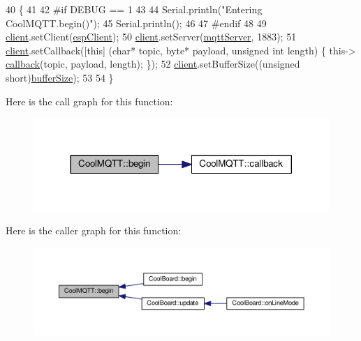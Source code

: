 \begin{DoxyCode}
40 \{ 
41 
42 \textcolor{preprocessor}{#if DEBUG == 1 }
43 
44     Serial.println(\textcolor{stringliteral}{"Entering CoolMQTT.begin()"});
45     Serial.println();
46 
47 \textcolor{preprocessor}{#endif}
48 
49     \hyperlink{classCoolMQTT_a4ca71e4f76ef868692a297efd45b1415}{client}.setClient(\hyperlink{classCoolMQTT_acc30a0200967374a524092a8a806502a}{espClient});
50     \hyperlink{classCoolMQTT_a4ca71e4f76ef868692a297efd45b1415}{client}.setServer(\hyperlink{classCoolMQTT_ab8bb951f87ddbf92db74c2ad16a3e53e}{mqttServer}, 1883); 
51     \hyperlink{classCoolMQTT_a4ca71e4f76ef868692a297efd45b1415}{client}.setCallback([\textcolor{keyword}{this}] (\textcolor{keywordtype}{char}* topic, byte* payload, \textcolor{keywordtype}{unsigned} \textcolor{keywordtype}{int} length) \{ this->
      \hyperlink{classCoolMQTT_a30d82ad665bfb603f46ecdbc290775df}{callback}(topic, payload, length); \});
52     \hyperlink{classCoolMQTT_a4ca71e4f76ef868692a297efd45b1415}{client}.setBufferSize((\textcolor{keywordtype}{unsigned} \textcolor{keywordtype}{short})\hyperlink{classCoolMQTT_a7f3cf26b51d6770f216e42c5ef13ca9f}{bufferSize});
53 
54 \}
\end{DoxyCode}
Here is the call graph for this function\+:\nopagebreak
\begin{figure}[H]
\begin{center}
\leavevmode
\includegraphics[width=317pt]{classCoolMQTT_ac9248808641ebf3054ed0620ea9d0100_cgraph}
\end{center}
\end{figure}
Here is the caller graph for this function\+:\nopagebreak
\begin{figure}[H]
\begin{center}
\leavevmode
\includegraphics[width=350pt]{classCoolMQTT_ac9248808641ebf3054ed0620ea9d0100_icgraph}
\end{center}
\end{figure}
\mbox{\label{classCoolMQTT_a30d82ad665bfb603f46ecdbc290775df}} 
